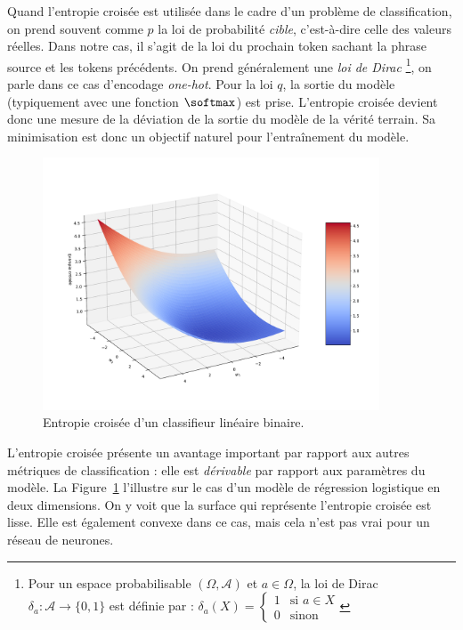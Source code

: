 Quand l'entropie croisée est utilisée dans le cadre d'un problème de classification,
on prend souvent comme \(p\) la loi de probabilité \emph{cible}, c'est-à-dire celle des valeurs réelles.
Dans notre cas, il s'agit de la loi du prochain token sachant la phrase source et les tokens précédents.
On prend généralement une \emph{loi de Dirac}%
\footnote{
    Pour un espace probabilisable \((\Omega, \mathcal{A})\) et \(a\in\Omega\),
    la loi de Dirac \(\delta_a: \mathcal{A} \to \{0, 1\}\) est définie par :
    \(
        \delta_a(X) = 
        \begin{cases}
            1 & \text{si } a \in X \\
            0 & \text{sinon}
        \end{cases}    
    \)
}, on parle dans ce cas d'encodage \emph{\foreignlanguage{english}{one-hot}}.
Pour la loi \(q\), la sortie du modèle (typiquement avec une fonction \(\softmax\)) est prise.
L'entropie croisée devient donc une mesure de la déviation de la sortie du modèle de la vérité terrain.
Sa minimisation est donc un objectif naturel pour l'entraînement du modèle.

\begin{figure}[htb]
    \begin{center}
        \includegraphics[width=10cm]{assets/python/cross-entropy.pdf}
    \end{center}
    \caption{Entropie croisée d'un classifieur linéaire binaire.}
    \label{fig.cross-entropy}
\end{figure}

L'entropie croisée présente un avantage important par rapport aux autres métriques de classification :
elle est \emph{dérivable} par rapport aux paramètres du modèle.
La Figure~\ref{fig.cross-entropy} l'illustre sur le cas d'un modèle de régression logistique en deux dimensions.
On y voit que la surface qui représente l'entropie croisée est lisse.
Elle est également convexe dans ce cas, mais cela n'est pas vrai pour un réseau de neurones.

